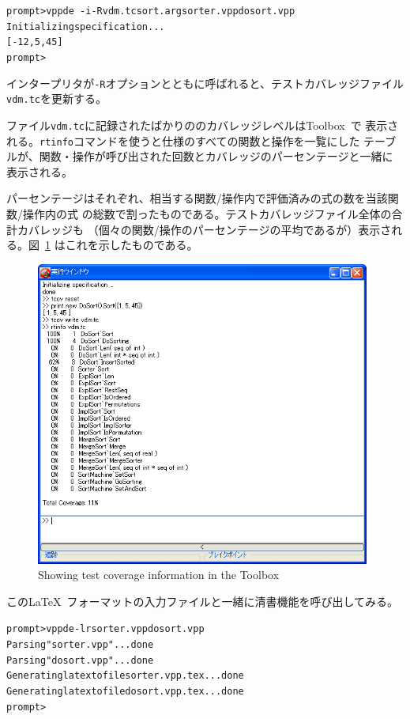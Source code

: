 \documentclass[\pformat,12pt]{jarticle}
\newcommand{\Toolbox}{Toolbox}
\newcommand{\vdmde}{vppde}
\newcommand{\cmd}{\tt }
\begin{document}
\begin{alltt}
prompt> \vdmde\ -i -R vdm.tc sort.arg sorter.vpp dosort.vpp
Initializing specification ... 
[ -12,5,45 ]
prompt>
\end{alltt}


インタープリタが{\tt -R}オプションとともに呼ばれると、テストカバレッジファイル{\tt vdm.tc}を更新する。

ファイル{\tt vdm.tc}に記録されたばかりののカバレッジレベルは\Toolbox\ で
表示される。{\cmd rtinfo}コマンドを使うと仕様のすべての関数と操作を一覧にした
テーブルが、関数・操作が呼び出された回数とカバレッジのパーセンテージと一緒に
表示される。

パーセンテージはそれぞれ、相当する関数/操作内で評価済みの式の数を当該関数/操作内の式
の総数で割ったものである。テストカバレッジファイル全体の合計カバレッジも
（個々の関数/操作のパーセンテージの平均であるが）表示される。図~\ref{fig:rtinfo} 
はこれを示したものである。

\begin{figure}[tbh]
\begin{center}
\includegraphics[width=11cm]{guitcov-pp.png}
\caption{Showing test coverage information in the \protect\Toolbox}
\label{fig:rtinfo}
\end{center}
\end{figure}

この\LaTeX\ フォーマットの入力ファイルと一緒に清書機能を呼び出してみる。


\begin{alltt}
prompt> \vdmde -lr sorter.vpp dosort.vpp 
Parsing "sorter.vpp" ... done
Parsing "dosort.vpp" ... done
Generating latex to file sorter.vpp.tex ... done
Generating latex to file dosort.vpp.tex ... done
prompt>
\end{alltt}
\end{document}
